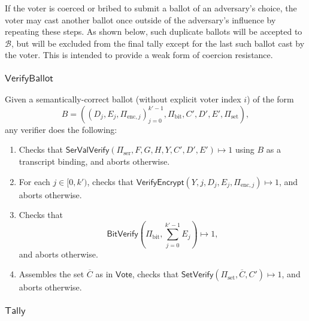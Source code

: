 \documentclass{llncs}
\newcommand{\func}[1]{\mathsf{#1}}
\begin{document}
If the voter is coerced or bribed to submit a ballot of an adversary's choice, the voter may cast another ballot once outside of the adversary's influence by repeating these steps.
As shown below, such duplicate ballots will be accepted to $\mathcal{B}$, but will be excluded from the final tally except for the last such ballot cast by the voter.
This is intended to provide a weak form of coercion resistance.


\subsubsection{\texorpdfstring{$\func{VerifyBallot}$}{VerifyBallot}}

Given a semantically-correct ballot (without explicit voter index $i$) of the form
\[ B = \left( (D_j, E_j, \Pi_{\text{enc},j})_{j=0}^{k'-1}, \Pi_{\text{bit}}, C', D', E', \Pi_{\text{set}} \right), \]
any verifier does the following:
\begin{enumerate}
    \item Checks that $\func{SerValVerify}(\Pi_{\text{ser}}, F, G, H, Y, C', D', E') \mapsto 1$ using $B$ as a transcript binding, and aborts otherwise.
    \item For each $j \in [0,k')$, checks that $\func{VerifyEncrypt}(Y, j, D_j, E_j, \Pi_{\text{enc},j}) \mapsto 1$, and aborts otherwise.
    \item Checks that \[ \func{BitVerify}\left( \Pi_{\text{bit}}, \sum_{j=0}^{k'-1} E_j \right) \mapsto 1, \] and aborts otherwise.
    \item Assembles the set $\overline{C}$ as in $\func{Vote}$, checks that $\func{SetVerify}(\Pi_{\text{set}}, \overline{C}, C') \mapsto 1$, and aborts otherwise.
\end{enumerate}


\subsubsection{\texorpdfstring{$\func{Tally}$}{Tally}}
\end{document}
